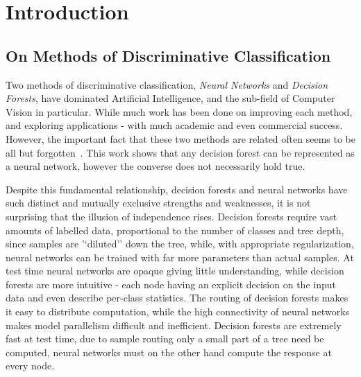 
\chapter{Introduction}  %

\ifpdf
    \graphicspath{{Chapter1/Figs/Raster/}{Chapter1/Figs/PDF/}{Chapter1/Figs/}}
\else
    \graphicspath{{Chapter1/Figs/Vector/}{Chapter1/Figs/}}
\fi


\section{On Methods of Discriminative Classification} %

Two methods of discriminative classification, \emph{Neural Networks} and \emph{Decision Forests}, have dominated Artificial Intelligence, and the sub-field of Computer Vision in particular. While much work has been done on improving each method, and exploring applications - with much academic and even commercial success. However, the important fact that these two methods are related often seems to be all but forgotten~\cite{Sethi1990,Welbl2014casting}. This work shows that any decision forest can be represented as a neural network, however the converse does not necessarily hold true.

Despite this fundamental relationship, decision forests and neural networks have such distinct and mutually exclusive strengths and weaknesses, it is not surprising that the illusion of independence rises. Decision forests require vast amounts of labelled data, proportional to the number of classes and tree depth, since samples are '`diluted'' down the tree, while, with appropriate regularization, neural networks can be trained with far more parameters than actual samples. At test time neural networks are opaque giving little understanding, while decision forests are more intuitive - each node having an explicit decision on the input data and even describe per-class statistics. The routing of decision forests makes it easy to distribute computation, while the high connectivity of neural networks makes model parallelism difficult and inefficient. Decision forests are extremely fast at test time, due to sample routing only a small part of a tree need be computed, neural networks must on the other hand compute the response at every node.  

